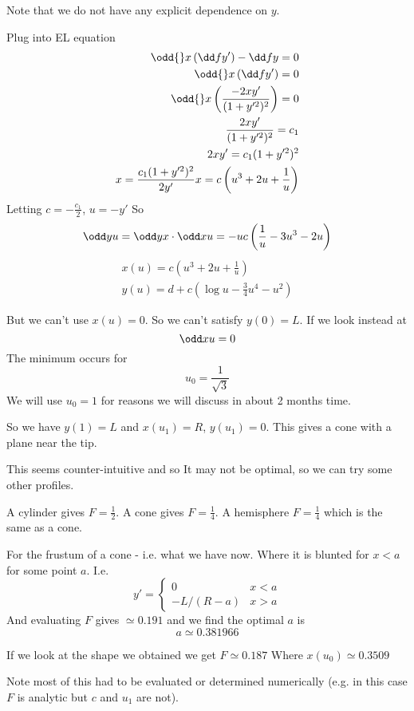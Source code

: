 \documentclass{X:/Documents/Coding/Latex/myassignment}
\begin{document}
Note that we do not have any explicit dependence on $y$.

Plug into EL equation
\begin{align*}
	\odd{}x \left(\dd f{y'}\right) - \dd fy = 0\\
	\odd{}x \left(\dd f{y'}\right)= 0\\
	\odd{}x \left(\frac{-2xy'}{(1+y'^2)^2}\right) = 0\\
	\frac{2xy'}{(1+y'^2)^2} = c_1\\
	2xy' = c_1(1+y'^2)^2\\
	x = \frac{c_1(1+y'^2)^2}{2y'}
 	x = c \left(u^3 + 2u + \frac1u\right)
\end{align*}
Letting $c = -\frac{c_1}{2}$, $u = - y'$
So
\[\odd yu = \odd yx \cdot \odd xu = -u c\left(\frac1u - 3u^3 - 2u\right)\]
\begin{align*}
	x(u) = c \left(u^3 + 2u + \frac1u\right)\\
	y(u) = d + c(\log u - \frac34 u^4 - u^2)
\end{align*}

But we can't use $x(u) = 0$. So we can't satisfy $y(0) = L$.
If we look instead at
\[\odd x u = 0\]
The minimum occurs for
\[u_0 = \frac{1}{\sqrt{3}}\]
We will use $u_0 = 1$ for reasons we will discuss in about 2 months time.

So we have $y(1) = L$ and $x(u_1) = R$, $y(u_1) = 0$.
This gives a cone with a plane near the tip.

This seems counter-intuitive and so It may not be optimal, so we can try some other profiles.

A cylinder gives $F = \frac12$. A cone gives $F = \frac14$. A hemisphere $F = \frac14$ which is the same as a cone.

For the frustum of a cone - i.e. what we have now. Where it is blunted for $x< a$ for some point $a$.
I.e.
\[y' = \begin{cases}
	0 & x<a\\
	-L/(R-a) & x>a
\end{cases}\]
And evaluating $F$ gives $\simeq 0.191$ and we find the optimal $a$ is
\[a \simeq 0.381966\]

If we look at the shape we obtained we get $F \simeq 0.187$
Where $x(u_0) \simeq 0.3509$

Note most of this had to be evaluated or determined numerically (e.g. in this case $F$ is analytic but $c$ and $u_1$ are not).
\end{document}
